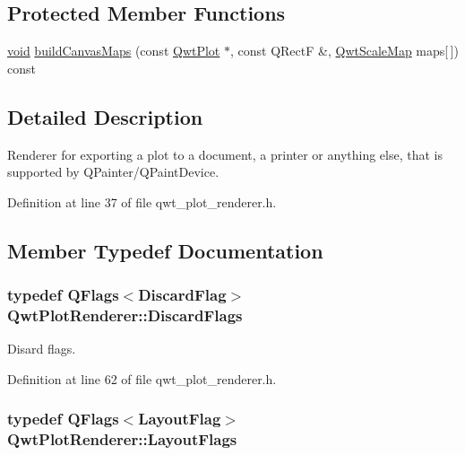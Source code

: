 \subsection*{Protected Member Functions}
\begin{DoxyCompactItemize}
\item 
\hyperlink{group___u_a_v_objects_plugin_ga444cf2ff3f0ecbe028adce838d373f5c}{void} \hyperlink{class_qwt_plot_renderer_aff25d0d1d9fe2c8ac3e62bcadc8e8284}{build\-Canvas\-Maps} (const \hyperlink{class_qwt_plot}{Qwt\-Plot} $\ast$, const Q\-Rect\-F \&, \hyperlink{class_qwt_scale_map}{Qwt\-Scale\-Map} maps\mbox{[}$\,$\mbox{]}) const 
\end{DoxyCompactItemize}


\subsection{Detailed Description}
Renderer for exporting a plot to a document, a printer or anything else, that is supported by Q\-Painter/\-Q\-Paint\-Device. 

Definition at line 37 of file qwt\-\_\-plot\-\_\-renderer.\-h.



\subsection{Member Typedef Documentation}
\hypertarget{class_qwt_plot_renderer_aa61638c08ef926c0148dd12c9f830b2d}{
\subsubsection[{Discard\-Flags}]{\setlength{\rightskip}{0pt plus 5cm}typedef Q\-Flags$<${\bf Discard\-Flag}$>$ {\bf Qwt\-Plot\-Renderer\-::\-Discard\-Flags}}}\label{class_qwt_plot_renderer_aa61638c08ef926c0148dd12c9f830b2d}


Disard flags. 



Definition at line 62 of file qwt\-\_\-plot\-\_\-renderer.\-h.

\hypertarget{class_qwt_plot_renderer_a20cf36bbea6b03a023d34c25b8b4b295}{
\subsubsection[{Layout\-Flags}]{\setlength{\rightskip}{0pt plus 5cm}typedef Q\-Flags$<${\bf Layout\-Flag}$>$ {\bf Qwt\-Plot\-Renderer\-::\-Layout\-Flags}}}\label{class_qwt_plot_renderer_a20cf36bbea6b03a023d34c25b8b4b295}


